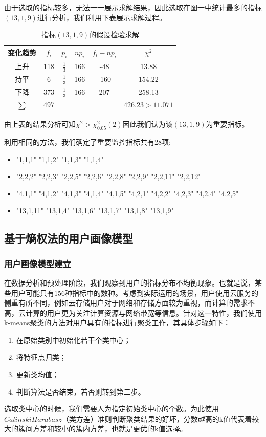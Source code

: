 \documentclass{my_paper}
\begin{document}
由于选取的指标较多，无法一一展示求解结果，因此选取在图一中统计最多的指标$(13,1,9)$进行分析，我们利用下表展示求解过程。
\begin{table}[htb]
\centering
\caption{指标$(13,1,9)$的假设检验求解}
\begin{tabular}{cccccc}
\toprule
变化趋势&$f_i$&$ p_i $&$ np_i $&$ f_i-np_i $&$ \chi^2 $ \\ \midrule
上升& 118 &  $\frac{1}{3}$&166&-48&13.88 \\
持平& 6 &  $\frac{1}{3}$&166&-160&154.22 \\
下降& 373 &  $\frac{1}{3}$&166&207&258.13 \\
$\sum$ & 497 &&&&$426.23>11.071$ \\
\bottomrule
  \end{tabular}
\label{label}
\end{table}

由上表的结果分析可知$\chi ^2 > \chi^2_{0.05}(2)$因此我们认为该$(13,1,9)$为重要指标。

利用相同的方法，我们确定了重要监控指标共有28项:
\begin{itemize}
    \item "1,1,1"	"1,1,2"	"1,1,3"	"1,1,4"	
    \item "2,2,2"	"2,2,3"	"2,2,5"	"2,2,6"	"2,2,8"	"2,2,9" "2,2,11" "2,2,12"	
    \item "4,1,1"	"4,1,2"	"4,1,3"	"4,1,4"	"4,1,5"	"4,2,1"	"4,2,2"	"4,2,3"	"4,2,4"	"4,2,5"
    \item "13,1,11"	"13,1,4"	"13,1,6"	"13,1,7"	"13,1,8"	"13,1,9"
\end{itemize}
	
\subsection{基于熵权法的用户画像模型}

\subsubsection{用户画像模型建立}
在数据分析和预处理阶段，我们观察到用户的指标分布不均衡现象。也就是说，某些用户可能只有156种指标中的数种。考虑到实际运用的场景，用户使用云服务的侧重有所不同，例如云存储用户对于网络和存储方面较为重视，而计算的需求不高，云计算的用户更为关注计算资源与网络带宽等信息。针对这一特性，我们使用k-means聚类\cite{6}的方法对用户具有的指标进行聚类工作，其具体步骤如下：

\begin{enumerate}
    \item 在原始类别中初始化若干个类中心；
    \item 将特征点归类；
    \item 更新类均值；
    \item 判断算法是否结束，若否则转到第二步。
\end{enumerate}
选取类中心的时候，我们需要人为指定初始类中心的个数。为此使用$CalinskiHarabasz$\cite{7}（类方差）准则判断聚类结果的好坏，分数越高的k值代表着较大的簇间方差和较小的簇内方差，也就是更优的k值选择。
\end{document}
